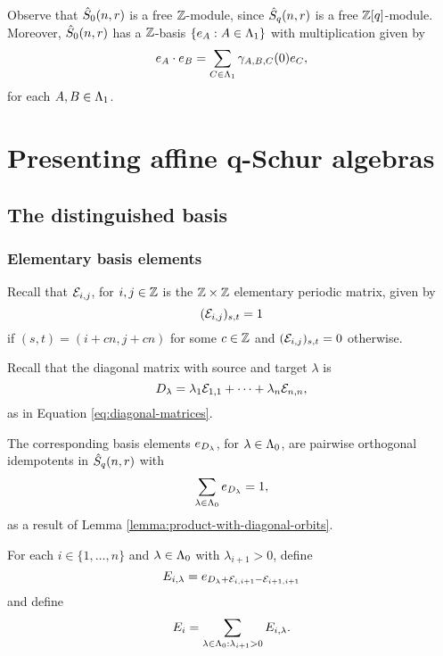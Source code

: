 \documentclass[a4paper, 11pt]{report}
\begin{document}
Observe that $\hat{S}_0(n,r)$ is a free $\mathbb{Z}$-module, since $\hat{S}_q(n,r)$ is a free $\mathbb{Z}[q]$-module. Moreover, $\hat{S}_0(n,r)$ has a $\mathbb{Z}$-basis $\{e_A:A\in\Lambda_1{}\}$ with multiplication given by
\begin{equation*}
e_A\cdot e_B = \sum_{C\in\Lambda_1{}} \gamma_{A,B,C}{(0)} e_C,
\end{equation*}
for each $A,B\in\Lambda_1{}$.


\chapter{Presenting affine q-Schur algebras}

\section{The distinguished basis}

\subsection{Elementary basis elements}

Recall that $\mathcal{E}_{i,j}$, for $i,j\in\mathbb{Z}$ is the $\mathbb{Z}\times\mathbb{Z}$ elementary periodic matrix, given by
\begin{equation*}
(\mathcal{E}_{i,j})_{s,t}=1
\end{equation*}
if $(s,t) = (i+cn,j+cn)$ for some $c\in\mathbb{Z}$ and $(\mathcal{E}_{i,j})_{s,t}=0$ otherwise.

Recall that the diagonal matrix with source and target $\lambda$ is
\begin{equation*}
D_{\lambda} = \lambda_1\mathcal{E}_{1,1} +\cdots + \lambda_n\mathcal{E}_{n,n},
\end{equation*}
as in Equation \ref{eq:diagonal-matrices}.

The corresponding basis elements $e_{D_{\lambda}}$, for $\lambda\in\Lambda_0{}$, are pairwise orthogonal idempotents in $\hat{S}_q(n,r)$ with
\begin{equation*}
\sum_{\lambda\in\Lambda_0{}}e_{D_{\lambda}} = 1,
\end{equation*}
as a result of Lemma \ref{lemma:product-with-diagonal-orbits}.

For each $i\in\{1,\ldots,n\}$ and $\lambda\in\Lambda_0{}$ with $\lambda_{i+1}>0$, define
\begin{equation*}
E_{i,\lambda} = e_{D_{\lambda} + \mathcal{E}_{i,i+1} - \mathcal{E}_{i+1,i+1}}
\end{equation*}
and define
\begin{equation*}
E_i = \sum_{\lambda\in\Lambda_0{}:\lambda_{i+1}>0} E_{i,\lambda}.
\end{equation*}
\end{document}

